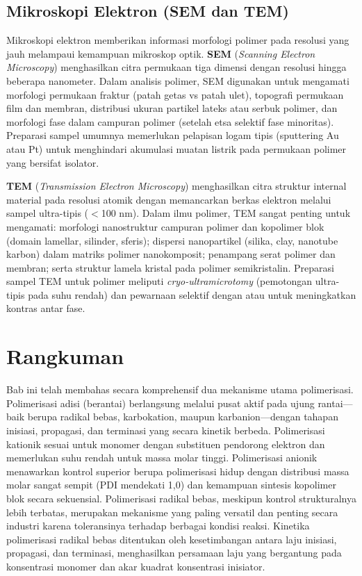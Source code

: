 \documentclass[12pt,a4paper,openany]{book}
\begin{document}
\subsection{Mikroskopi Elektron (SEM dan TEM)}

Mikroskopi elektron memberikan informasi morfologi polimer pada resolusi yang jauh melampaui kemampuan mikroskop optik. \textbf{SEM} (\textit{Scanning Electron Microscopy}) menghasilkan citra permukaan tiga dimensi dengan resolusi hingga beberapa nanometer. Dalam analisis polimer, SEM digunakan untuk mengamati morfologi permukaan fraktur (patah getas vs patah ulet), topografi permukaan film dan membran, distribusi ukuran partikel lateks atau serbuk polimer, dan morfologi fase dalam campuran polimer (setelah etsa selektif fase minoritas). Preparasi sampel umumnya memerlukan pelapisan logam tipis (sputtering Au atau Pt) untuk menghindari akumulasi muatan listrik pada permukaan polimer yang bersifat isolator.

\textbf{TEM} (\textit{Transmission Electron Microscopy}) menghasilkan citra struktur internal material pada resolusi atomik dengan memancarkan berkas elektron melalui sampel ultra-tipis ($<$100 nm). Dalam ilmu polimer, TEM sangat penting untuk mengamati: morfologi nanostruktur campuran polimer dan kopolimer blok (domain lamellar, silinder, sferis); dispersi nanopartikel (silika, clay, nanotube karbon) dalam matriks polimer nanokomposit; penampang serat polimer dan membran; serta struktur lamela kristal pada polimer semikristalin. Preparasi sampel TEM untuk polimer meliputi \textit{cryo-ultramicrotomy} (pemotongan ultra-tipis pada suhu rendah) dan pewarnaan selektif dengan  atau  untuk meningkatkan kontras antar fase.

\section{Rangkuman}

Bab ini telah membahas secara komprehensif dua mekanisme utama polimerisasi. Polimerisasi adisi (berantai) berlangsung melalui pusat aktif pada ujung rantai---baik berupa radikal bebas, karbokation, maupun karbanion---dengan tahapan inisiasi, propagasi, dan terminasi yang secara kinetik berbeda. Polimerisasi kationik sesuai untuk monomer dengan substituen pendorong elektron dan memerlukan suhu rendah untuk massa molar tinggi. Polimerisasi anionik menawarkan kontrol superior berupa polimerisasi hidup dengan distribusi massa molar sangat sempit (PDI mendekati 1,0) dan kemampuan sintesis kopolimer blok secara sekuensial. Polimerisasi radikal bebas, meskipun kontrol strukturalnya lebih terbatas, merupakan mekanisme yang paling versatil dan penting secara industri karena toleransinya terhadap berbagai kondisi reaksi. Kinetika polimerisasi radikal bebas ditentukan oleh kesetimbangan antara laju inisiasi, propagasi, dan terminasi, menghasilkan persamaan laju yang bergantung pada konsentrasi monomer dan akar kuadrat konsentrasi inisiator.
\end{document}
